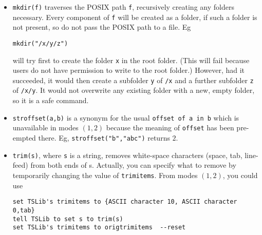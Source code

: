 \documentclass[11pt]{amsart}
\begin{document}
\begin{itemize}
\begin{verbatim}
{"/Users/Al/Documents","eg","eg.tex"}
\end{verbatim}
 if the file had not been saved with extension hidden, and otherwise it would return \begin{verbatim}
{"/Users/Al/Documents","eg","eg"}
\end{verbatim}
 This gives you an easy way to construct the equivalents of 
\verb|#..#| items when you open a new {\tt.tex} file in a script. Eg, having specified an existing tex file with POSIX path string s,
\begin{verbatim}
tell TSLib to set {pdir, shortname, displayname} to docname(s)
set dviname to pdir & "/" & shortname & ".dvi"
\end{verbatim}
\item {\tt mkdir(f)} traverses the POSIX path {\tt f}, recursively creating any folders necessary. Every component of {\tt f} will be created as a folder, if such a folder is not present, so do not pass the POSIX path to a file. Eg
\begin{verbatim}
mkdir("/x/y/z")
\end{verbatim}
will try first to create the folder \verb|x| in the root folder. (This will fail because users do not have permission to write to the root folder.) However, had it succeeded, it would then create a subfolder {\tt y} of \verb|/x| and a further subfolder {\tt z} of \verb|/x/y|. It would not overwrite any existing folder with a new, empty folder, so it is a safe command.
\item {\tt stroffset(a,b)} is a synonym for the usual {\tt offset of a in b} which is unavailable in modes $(1,2)$ because the meaning of {\tt offset} has been pre-empted there. Eg, {\tt stroffset("b","abc")} returns $2$.
\item {\tt trim(s)}, where {\tt s} is a string, removes white-space characters (space, tab, line-feed) from both ends of s. Actually, you can specify what to remove by temporarily changing the value of {\tt trimitems}. From modes $(1,2)$, you could use
\begin{verbatim}
set TSLib's trimitems to {ASCII character 10, ASCII character 0,tab}
tell TSLib to set s to trim(s)
set TSLib's trimitems to origtrimitems  --reset
\end{verbatim}
\end{itemize}
\end{document}
